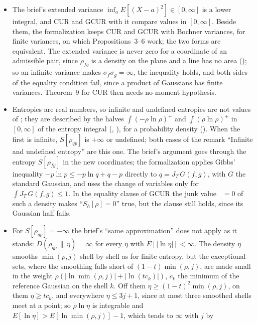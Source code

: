 \documentclass[11pt]{article}
\begin{document}
\begin{itemize}
  are taken $C^1$, which is what  asks for; since $\eta$ can be taken smooth,
  so can they.
\item The brief's extended variance $\inf_a E[(X - a)^2] \in [0, \infty]$ is a lower
  integral, and CUR and GCUR with it compare values in $[0, \infty]$. Beside them, the
  formalization keeps CUR and GCUR with Bochner variances, for finite variances, on which
  Propositions~3--6 work; the two forms are equivalent. The extended variance is never zero for
  a coordinate of an admissible pair, since $\rho_{fg}$ is a density on the plane and a line has
  no area (); so an infinite variance makes
  $\sigma_f\sigma_g = \infty$, the inequality holds, and both sides of the equality condition
  fail, since a product of Gaussians has finite variances. Theorem~9 for CUR then needs no
  moment hypothesis.
\item Entropies are real numbers, so infinite and undefined entropies are not values of
  ; they are described by the halves $\int(-\rho\ln\rho)^+$ and
  $\int(\rho\ln\rho)^+$ in $[0, \infty]$ of the entropy integral (,
  ), for a probability density (). When the first is infinite,
  $S[\rho_{qp}]$ is $+\infty$ or undefined; both cases of the remark ``Infinite and
  undefined entropy'' are this one. The brief's argument goes through the entropy
  $S[\rho_{fg}]$ in the new coordinates; the formalization applies Gibbs' inequality
  $-p\ln p \le -p\ln q + q - p$ directly to $q = J_T\,G(f, g)$, with $G$ the standard Gaussian,
  and uses the change of variables only for $\int J_T\,G(f, g) \le 1$. In the equality clause
  of GCUR the junk value ~$= 0$ of such a density makes ``$S_h[\rho] = 0$''
  true, but the clause still holds, since its Gaussian half fails.
\item For $S[\rho_{qp}] = -\infty$ the brief's ``same approximation'' does not apply as it stands:
  $D(\rho_{qp}\,\|\,\eta) = \infty$ for every $\eta$ with $E[|\ln\eta|] < \infty$. The density
  $\eta$ smooths $\min(\rho, j)$ shell by shell as for finite entropy, but the exceptional sets,
  where the smoothing falls short of $(1 - t)\min(\rho, j)$, are made small in the weight
  $\rho(|\ln\min(\rho, j)| + |\ln(t c_k)|)$, $c_k$ the minimum of the reference Gaussian on the
  shell $k$. Off them $\eta \ge (1 - t)^2\min(\rho, j)$, on them $\eta \ge t c_k$, and everywhere
  $\eta \le 3j + 1$, since at most three smoothed shells meet at a point; so $\rho\ln\eta$ is
  integrable and $E[\ln\eta] > E[\ln\min(\rho, j)] - 1$, which tends to $\infty$ with $j$ by

\end{itemize}
\end{document}
